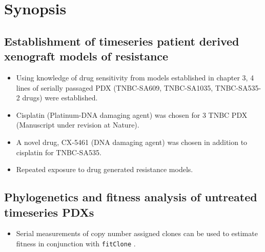\section{Synopsis}

\subsection {Establishment of timeseries patient derived xenograft models of resistance}
\begin{itemize}
\item	Using knowledge of drug sensitivity from models established in chapter 3, 4 lines of serially passaged PDX (TNBC-SA609, TNBC-SA1035, TNBC-SA535-2 drugs) were established.
\item	Cisplatin (Platinum-DNA damaging agent) was chosen for 3 TNBC PDX (Manuscript under revision at Nature).
\item	A novel drug, CX-5461 (DNA damaging agent) was chosen in addition to cisplatin for TNBC-SA535.
\item	Repeated exposure to drug generated resistance models.
\end{itemize}


\subsection {Phylogenetics and fitness analysis of untreated timeseries PDXs}
\begin{itemize}
\item Serial measurements of copy number assigned clones can be used to estimate fitness in conjunction with \texttt{fitClone} \cite{salehi2020single}.

\end{itemize}






